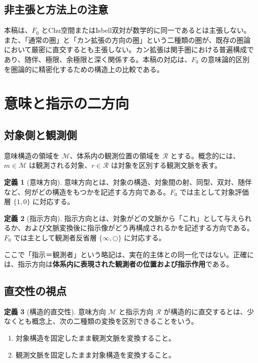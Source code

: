 \documentclass[a4paper,11pt]{ltjsarticle}
\theoremstyle{definition}
\newtheorem{definition}{定義}[section]
\theoremstyle{plain}
\newcommand{\Obj}{\mathcal M}
\newcommand{\Obs}{\mathcal R}
\begin{document}
\subsection{非主張と方法上の注意}

本稿は、$F_0$ とChu空間またはIsbell双対が数学的に同一であるとは主張しない。また、「通常の圏」と「カン拡張の方向の圏」という二種類の圏が、既存の圏論において厳密に直交するとも主張しない。カン拡張は関手圏における普遍構成であり、随伴、極限、余極限と深く関係する\cite{Kan1958,MacLane1998,Riehl2016}。本稿の対応は、$F_0$ の意味論的区別を圏論的に精密化するための構造上の比較である。

\section{意味と指示の二方向}

\subsection{対象側と観測側}

意味構造の領域を $\Obj$、体系内の観測位置の領域を $\Obs$ とする。概念的には、$m\in\Obj$ は観測される対象、$r\in\Obs$ は対象を区別する観測文脈を表す。

\begin{definition}[意味方向]
意味方向とは、対象の構造、対象間の射、同型、双対、随伴など、何がどの構造をもつかを記述する方向である。$F_0$ では主として対象評価層 $\{1,0\}$ に対応する。
\end{definition}

\begin{definition}[指示方向]
指示方向とは、対象がどの文脈から「これ」として与えられるか、および文脈変換後に指示像がどう再構成されるかを記述する方向である。$F_0$ では主として観測者反省層 $\{\infty,\bigcirc\}$ に対応する。
\end{definition}

ここで「指示＝観測者」という略記は、実在的主体との同一化ではない。正確には、指示方向は\textbf{体系内に表現された観測者の位置および指示作用}である。

\subsection{直交性の視点}

\begin{definition}[構造的直交性]
意味方向 $\Obj$ と指示方向 $\Obs$ が構造的に直交するとは、少なくとも概念上、次の二種類の変換を区別できることをいう。
\begin{enumerate}
 \item 対象構造を固定したまま観測文脈を変換すること。
 \item 観測文脈を固定したまま対象構造を変換すること。
\end{enumerate}
\end{definition}
\end{document}
